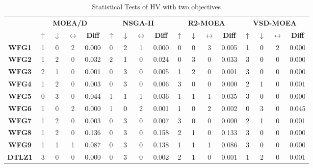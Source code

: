 \begin{table*}[t]
\caption{Statistical Tests of HV with two objectives}
\label{tab:Tests_HV_2obj}
\centering
\begin{tabular}{c c|c|c|c|c|c|c|c|c|c|c|c|c|c|c|c}
\cline{2-17}
 & \multicolumn{4}{c|}{\textbf{MOEA/D}} & \multicolumn{4}{c|}{\textbf{NSGA-II}} & \multicolumn{4}{c|}{\textbf{R2-MOEA}} & \multicolumn{4}{c}{\textbf{VSD-MOEA}} \\ \cline{2-17} 
 & \textbf{$\uparrow$} & \textbf{$\downarrow$} & \textbf{$\leftrightarrow$} & \textbf{Diff} & \textbf{$\uparrow$} & \textbf{$\downarrow$} & \textbf{$\leftrightarrow$} & \textbf{Diff} & \textbf{$\uparrow$} & \textbf{$\downarrow$} & \textbf{$\leftrightarrow$} & \textbf{Diff} & \textbf{$\uparrow$} & \textbf{$\downarrow$} & \textbf{$\leftrightarrow$} & \textbf{Diff} \\ \hline
\multicolumn{1}{c|}{\textbf{WFG1}} & 1 & 0 & 2 & 0.000 & 0 & 2 & 1 & 0.000 & 0 & 0 & 3 & 0.005 & 1 & 0 & 2 & 0.000 \\ \hline
\multicolumn{1}{c|}{\textbf{WFG2}} & 1 & 2 & 0 & 0.032 & 2 & 1 & 0 & 0.024 & 0 & 3 & 0 & 0.033 & 3 & 0 & 0 & 0.000 \\ \hline
\multicolumn{1}{c|}{\textbf{WFG3}} & 2 & 1 & 0 & 0.001 & 0 & 3 & 0 & 0.005 & 1 & 2 & 0 & 0.001 & 3 & 0 & 0 & 0.000 \\ \hline
\multicolumn{1}{c|}{\textbf{WFG4}} & 1 & 2 & 0 & 0.003 & 0 & 3 & 0 & 0.006 & 3 & 0 & 0 & 0.000 & 2 & 1 & 0 & 0.001 \\ \hline
\multicolumn{1}{c|}{\textbf{WFG5}} & 0 & 3 & 0 & 0.044 & 1 & 1 & 1 & 0.036 & 1 & 1 & 1 & 0.035 & 3 & 0 & 0 & 0.000 \\ \hline
\multicolumn{1}{c|}{\textbf{WFG6}} & 1 & 0 & 2 & 0.000 & 1 & 0 & 2 & 0.001 & 1 & 0 & 2 & 0.002 & 0 & 3 & 0 & 0.045 \\ \hline
\multicolumn{1}{c|}{\textbf{WFG7}} & 1 & 2 & 0 & 0.003 & 0 & 3 & 0 & 0.007 & 3 & 0 & 0 & 0.000 & 2 & 1 & 0 & 0.001 \\ \hline
\multicolumn{1}{c|}{\textbf{WFG8}} & 1 & 2 & 0 & 0.136 & 0 & 3 & 0 & 0.158 & 2 & 1 & 0 & 0.133 & 3 & 0 & 0 & 0.000 \\ \hline
\multicolumn{1}{c|}{\textbf{WFG9}} & 1 & 1 & 1 & 0.087 & 0 & 3 & 0 & 0.138 & 1 & 1 & 1 & 0.086 & 3 & 0 & 0 & 0.000 \\ \hline
\multicolumn{1}{c|}{\textbf{DTLZ1}} & 3 & 0 & 0 & 0.000 & 0 & 3 & 0 & 0.002 & 2 & 1 & 0 & 0.001 & 1 & 2 & 0 & 0.001 \\ \hline

\end{tabular}
\end{table*}
